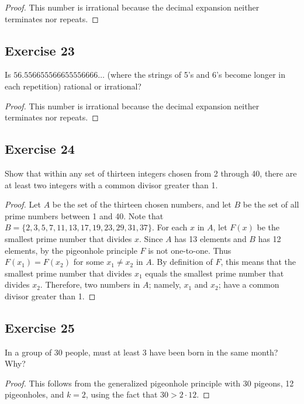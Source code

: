 \documentclass[14pt]{extarticle}
\begin{document}
\begin{proof}
     This number is irrational because the decimal expansion neither terminates nor repeats.
\end{proof}

\subsection{Exercise 23}
Is \(56.556655566655556666 \ldots\)  (where the strings of 5’s and 6’s become longer in each repetition) rational or
irrational?

\begin{proof}
     This number is irrational because the decimal expansion neither terminates nor repeats.
\end{proof}

\subsection{Exercise 24}
Show that within any set of thirteen integers chosen from 2 through 40, there are at least two integers with a common
divisor greater than 1.

\begin{proof}
     Let \(A\) be the set of the thirteen chosen numbers, and let \(B\) be the set of all prime numbers between 1 and 40.
     Note that \(B = \{2, 3, 5, 7, 11, 13, 17, 19, 23, 29, 31, 37\}\). For each \(x\) in \(A\), let \(F(x)\) be the
     smallest prime number that divides \(x\). Since \(A\) has 13 elements and \(B\) has 12 elements, by the pigeonhole
     principle \(F\) is not one-to-one. Thus \(F(x_1) = F(x_2)\) for some \(x_1 \neq x_2\) in \(A\). By definition of \(F\),
     this means that the smallest prime number that divides \(x_1\) equals the smallest prime number that divides
     \(x_2\). Therefore, two numbers in \(A\); namely, \(x_1\) and \(x_2\); have a common divisor greater than 1.
\end{proof}

\subsection{Exercise 25}
In a group of 30 people, must at least 3 have been born in the same month? Why?

\begin{proof}
     This follows from the generalized pigeonhole principle with 30 pigeons, 12 pigeonholes, and \(k = 2\), using the fact that \(30 > 2 \cdot 12\).
\end{proof}
\end{document}
